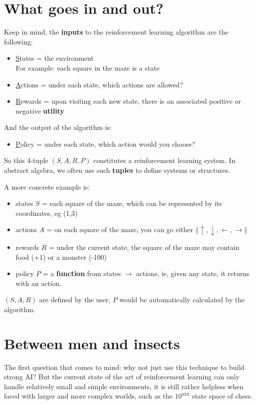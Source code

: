 \documentclass[orivec]{llncs}
\begin{document}
\section{What goes in and out?}

Keep in mind, the \textbf{inputs} to the reinforcement learning algorithm are the following:\let\labelitemi\labelitemii
\begin{itemize}
\item \underline{S}tates = the environment \\
For example: each square in the maze is a state
\item \underline{A}ctions = under each state, which actions are allowed?
\item \underline{R}ewards =  upon visiting each new state, there is an associated positive or negative \textbf{utility}
\end{itemize}
And the output of the algorithm is:
\begin{itemize}
\item \underline{P}olicy = under each state, which action would you choose?
\end{itemize}
So this 4-tuple $(S, A, R, P)$ constitutes a reinforcement learning system.  In abstract algebra, we often use such \textbf{tuples} to define systems or structures.

A more concrete example is:
\begin{itemize}
\item states $S$ =  each square of the maze, which can be represented by its coordinates, eg (1,3)
\item actions $A$ = on each square of the maze, you can go either $\{ \uparrow, \downarrow, \leftarrow, \rightarrow \}$
\item rewards $R$ = under the current state, the square of the maze may contain food (+1) or a monster (-100)
\item policy $P$ = a \textbf{function} from states $\rightarrow$ actions, ie, given any state, it returns with an action.

\end{itemize}
$(S, A, R)$ are defined by the user, $P$ would be automatically calculated by the algorithm.

\section{Between men and insects}

The first question that comes to mind:  why not just use this technique to build strong AI?  But the current state of the art of reinforcement learning can only handle relatively small and simple environments, it is still rather helpless when faced with larger and more complex worlds, such as the $10^{\mbox{xxx}}$ state space of chess.
\end{document}
